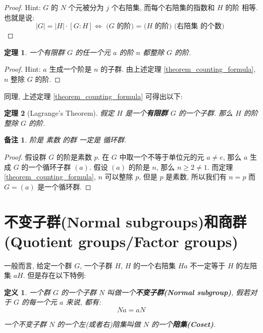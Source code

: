 \documentclass[utf8]{ctexbook}
\newtheorem{theorem}{定理}[section]
\newtheorem{definition}{定义}[section]
\newtheorem{memo}{备注}[section]
\begin{document}
\begin{proof}
Hint: $G$ 的 $N$ 个元被分为 $j$ 个右陪集, 而每个右陪集的指数和 $H$ 的阶 相等. 也就是说:
\begin{equation}
|G| = |H| \cdot [G : H] \iff \mbox{ ($G$ 的阶) = ($H$ 的阶) (右陪集 的个数) }  \nonumber
\end{equation}
\end{proof}

\begin{theorem}\label{theorem_finite_group_rank_divisable}
一个有限群 $G$ 的任一个元 $a$ 的阶 $n$ 都整除 $G$ 的阶.

\end{theorem}

\begin{proof}
Hint: $a$ 生成一个阶是 $n$ 的子群. 由上述定理 \ref{theorem_counting_formula}, $n$ 整除 $G$ 的阶.
\end{proof}

同理, 上述定理 \ref{theorem_counting_formula} 可得出以下:
\begin{theorem}[Lagrange’s Theorem]
假定 $H$ 是一个\textbf{有限群 $G$} 的一个子群. 那么 $H$ 的阶 整除 $G$ 的阶.
\end{theorem}


\begin{memo}\label{memo_prime_cyclic_group}
阶是 素数 的群 一定是 循环群.
\end{memo}

\begin{proof}
假设群 $G$ 的阶是素数 $p$. 在 $G$ 中取一个不等于单位元的元 $a \neq e$, 那么 $a$ 生成 $G$ 的一个循环子群 $(a)$. 假设 $(a)$ 的阶是 $n$, 那么 $n \geq 2 \neq 1$. 而定理 \ref{theorem_counting_formula}, $n$ 可以整除 $p$, 但是 $p$ 是素数, 所以我们有 $n=p$ 而 $G = (a)$ 是一个循环群. 
\end{proof}

\section{不变子群(Normal subgroups)和商群(Quotient groups/Factor groups)}

一般而言, 给定一个群 $G$, 一个子群 $H$, $H$ 的一个右陪集 $Ha$ 不一定等于 $H$ 的左陪集 $aH$. 但是存在以下特例:

\begin{definition}
一个群 $G$ 的一个子群 $N$ 叫做一个\textbf{不变子群(Normal subgroup)}, 假若对于 $G$ 的每一个元 $a$ 来说, 都有:
\begin{equation*}
Na = aN
\end{equation*}

一个不变子群 $N$ 的一个左(或者右)陪集叫做 $N$ 的一个\textbf{陪集(Coset)}.
\end{definition}
\end{document}
